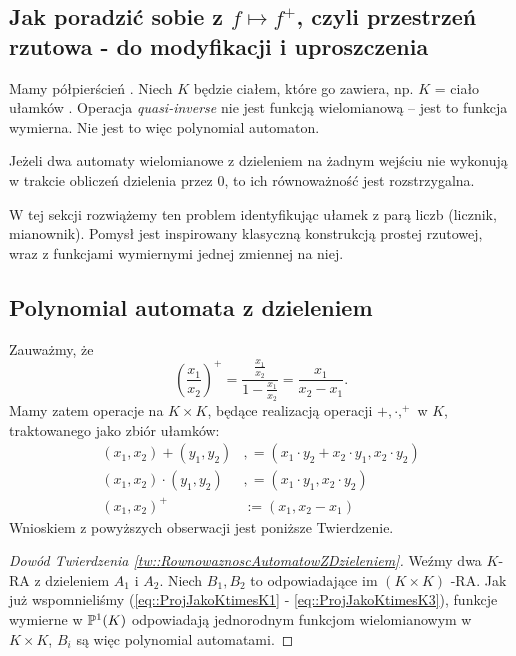 \begin{df}
\section{Jak poradzić sobie z $f\mapsto f^+$, czyli przestrzeń rzutowa - do modyfikacji i uproszczenia}
Mamy półpierścień \Nratqr. Niech $K$ będzie ciałem, które go zawiera, np. $K$ = ciało ułamków \Zrat. Operacja \emph{quasi-inverse} nie jest funkcją wielomianową -- jest to funkcja wymierna. Nie jest to więc polynomial automaton.
\begin{tw}\label{tw::RownowaznoscAutomatowZDzieleniem}
	Jeżeli dwa automaty wielomianowe z dzieleniem na żadnym wejściu nie wykonują w  trakcie obliczeń dzielenia przez 0, to ich równoważność jest rozstrzygalna.
\end{tw}

W tej sekcji rozwiążemy ten problem identyfikując ułamek z parą liczb (licznik, mianownik). Pomysł jest inspirowany klasyczną konstrukcją prostej rzutowej, wraz z funkcjami wymiernymi jednej zmiennej na niej.
\subsection{Polynomial automata z dzieleniem}
Zauważmy, że
\[
	\left( \frac{x_1}{x_2} \right)^+=\frac{\frac{x_1}{x_2}}{1-\frac{x_1}{x_2}} = \frac{x_1}{ x_2 - x_1}.
\]
Mamy zatem operacje na $K \times K$, będące realizacją operacji $+, \cdot, ^+$ w $K$, traktowanego jako zbiór ułamków: 
\begin{subequations}
	\renewcommand{\theequation}{\theparentequation.\arabic{equation}}
	\begin{align}\label{eq::ProjJakoKtimesK1}
	(x_1, x_2) + (y_1, y_2) &, = (x_1 \cdot y_2 + x_2 \cdot y_1, x_2 \cdot y_2)\\
	(x_1, x_2) \cdot (y_1, y_2) &, = (x_1 \cdot y_1, x_2 \cdot y_2) \\
	(x_1, x_2)^+      &:= (x_1, x_2 -x_1) \label{eq::ProjJakoKtimesK3}
	\end{align}
\end{subequations}
Wnioskiem z powyższych obserwacji jest poniższe Twierdzenie.
\begin{proof}[Dowód Twierdzenia \ref{tw::RownowaznoscAutomatowZDzieleniem}]
	Weźmy dwa $K$-RA z dzieleniem $A_1$ i $A_2$. Niech $B_1, B_2$ to odpowiadające im $(K \times K)$ -RA.
	Jak już wspomnieliśmy (\eqref{eq::ProjJakoKtimesK1} - \eqref{eq::ProjJakoKtimesK3}), funkcje wymierne w $\mathbb{P}^{1}(K)$ odpowiadają jednorodnym funkcjom wielomianowym w $K \times K$, $B_i$ są więc polynomial automatami.
	

\end{proof}
\end{df}
